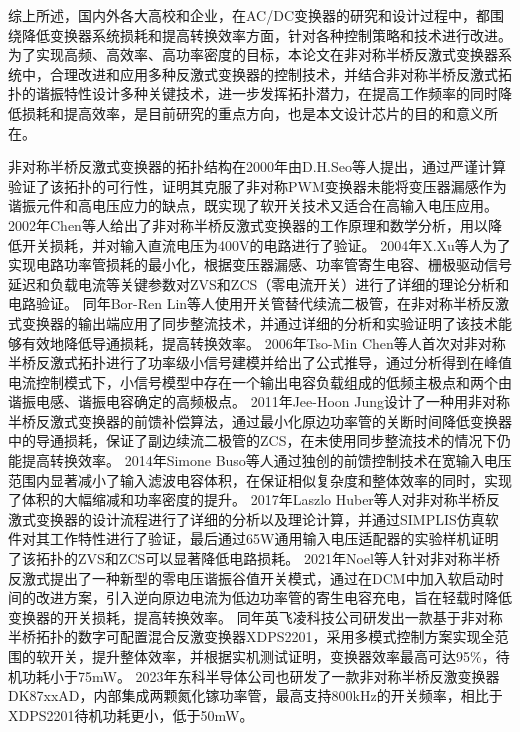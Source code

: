 综上所述，国内外各大高校和企业，在AC/DC变换器的研究和设计过程中，都围绕降低变换器系统损耗和提高转换效率方面，针对各种控制策略和技术进行改进。为了实现高频、高效率、高功率密度的目标，本论文在非对称半桥反激式变换器系统中，合理改进和应用多种反激式变换器的控制技术，并结合非对称半桥反激式拓扑的谐振特性设计多种关键技术，进一步发挥拓扑潜力，在提高工作频率的同时降低损耗和提高效率，是目前研究的重点方向，也是本文设计芯片的目的和意义所在。 

\iffalse
非对称半桥反激式变换器的拓扑结构在2000年由D.H.Seo等人提出，通过严谨计算验证了该拓扑的可行性，证明其克服了非对称PWM变换器未能将变压器漏感作为谐振元件和高电压应力的缺点，既实现了软开关技术又适合在高输入电压应用\cite{seo2000_AHB}。
2002年Chen等人给出了非对称半桥反激式变换器的工作原理和数学分析，用以降低开关损耗，并对输入直流电压为400V的电路进行了验证\cite{chen2002_AHB,chen2002_AHB1}。
2004年X.Xu等人为了实现电路功率管损耗的最小化，根据变压器漏感、功率管寄生电容、栅极驱动信号延迟和负载电流等关键参数对ZVS和ZCS（零电流开关）进行了详细的理论分析和电路验证\cite{xu2004_AHB}。
同年Bor-Ren Lin等人使用开关管替代续流二极管，在非对称半桥反激式变换器的输出端应用了同步整流技术，并通过详细的分析和实验证明了该技术能够有效地降低导通损耗，提高转换效率\cite{lin2005_AHB}。
2006年Tso-Min Chen等人首次对非对称半桥反激式拓扑进行了功率级小信号建模并给出了公式推导，通过分析得到在峰值电流控制模式下，小信号模型中存在一个输出电容负载组成的低频主极点和两个由谐振电感、谐振电容确定的高频极点\cite{chen2006_AHB}。
2011年Jee-Hoon Jung设计了一种用非对称半桥反激式变换器的前馈补偿算法，通过最小化原边功率管的关断时间降低变换器中的导通损耗，保证了副边续流二极管的ZCS\cite{jung2011_AHB}，在未使用同步整流技术的情况下仍能提高转换效率。
2014年Simone Buso等人通过独创的前馈控制技术在宽输入电压范围内显著减小了输入滤波电容体积，在保证相似复杂度和整体效率的同时，实现了体积的大幅缩减和功率密度的提升\cite{buso2014_AHB}。
2017年Laszlo Huber等人对非对称半桥反激式变换器的设计流程进行了详细的分析以及理论计算，并通过SIMPLIS仿真软件对其工作特性进行了验证，最后通过65W通用输入电压适配器的实验样机证明了该拓扑的ZVS和ZCS可以显著降低电路损耗\cite{huber2017_AHB}。
2021年Noel等人针对非对称半桥反激式提出了一种新型的零电压谐振谷值开关模式，通过在DCM中加入软启动时间的改进方案，引入逆向原边电流为低边功率管的寄生电容充电，旨在轻载时降低变换器的开关损耗，提高转换效率\cite{medina2021advanced}。
同年英飞凌科技公司研发出一款基于非对称半桥拓扑的数字可配置混合反激变换器XDPS2201，采用多模式控制方案实现全范围的软开关，提升整体效率，并根据实机测试证明，变换器效率最高可达95\%，待机功耗小于75mW。
2023年东科半导体公司也研发了一款非对称半桥反激变换器DK87xxAD，内部集成两颗氮化镓功率管，最高支持800kHz的开关频率，相比于XDPS2201待机功耗更小，低于50mW。


